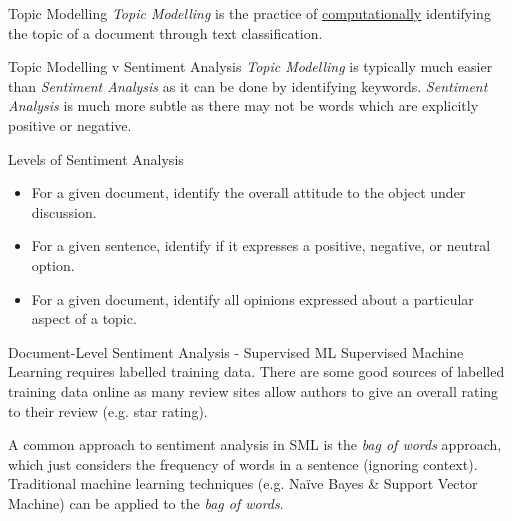 \documentclass[11pt,a4paper]{article}
\begin{document}
  \begin{definition}{Topic Modelling}
    \textit{Topic Modelling} is the practice of \underline{computationally} identifying the topic of a document through text classification.
  \end{definition}

  \begin{remark}{Topic Modelling v Sentiment Analysis}
    \textit{Topic Modelling} is typically much easier than \textit{Sentiment Analysis} as it can be done by identifying keywords. \textit{Sentiment Analysis} is much more subtle as there may not be words which are explicitly positive or negative.
  \end{remark}

  \begin{proposition}{Levels of Sentiment Analysis}
    \begin{itemize}
      \item[\textit{Document-Level}] For a given document, identify the overall attitude to the object under discussion.
      \item[\textit{Sentence-Level}] For a given sentence, identify if it expresses a positive, negative, or neutral option.
      \item[\textit{Aspect-Level}] For a given document, identify all opinions expressed about a particular aspect of a topic.
    \end{itemize}
  \end{proposition}

  \begin{proposition}{Document-Level Sentiment Analysis - Supervised ML}
    Supervised Machine Learning requires labelled training data. There are some good sources of labelled training data online as many review sites allow authors to give an overall rating to their review (e.g. star rating).
    \par A common approach to sentiment analysis in SML is the \textit{bag of words} approach, which just considers the frequency of words in a sentence (ignoring context). Traditional machine learning techniques (e.g. Na\"ive Bayes \& Support Vector Machine) can be applied to the \textit{bag of words}.
  \end{proposition}
\end{document}
